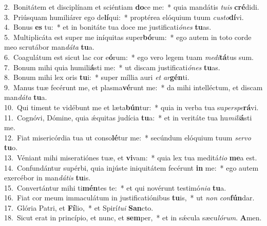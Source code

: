 {2.~}Bonitátem et disciplínam et sciéntiam \textbf{do}ce me:~* quia mandátis \textit{tu}\textit{is} \textbf{cré}didi.\\
{3.~}Priúsquam humiliárer ego de\textbf{lí}qui:~* proptérea elóquium tuum \textit{cu}\textit{sto}\textbf{dí}vi.\\
{4.~}Bonus \textbf{es} tu:~* et in bonitáte tua doce me justificati\textit{ó}\textit{nes} \textbf{tu}as.\\
{5.~}Multiplicáta est super me iníquitas super\textbf{bó}rum:~* ego autem in toto corde meo scrutábor man\textit{dá}\textit{ta} \textbf{tu}a.\\
{6.~}Coagulátum est sicut lac cor e\textbf{ó}rum:~* ego vero legem tuam \textit{me}\textit{di}\textbf{tá}tus sum.\\
{7.~}Bonum mihi quia humili\textbf{á}sti me:~* ut discam justificati\textit{ó}\textit{nes} \textbf{tu}as.\\
{8.~}Bonum mihi lex oris \textbf{tu}i:~* super míllia auri \textit{et} \textit{ar}\textbf{gén}ti.\\
{9.~}Manus tuæ fecérunt me, et plasma\textbf{vé}runt me:~* da mihi intelléctum, et discam man\textit{dá}\textit{ta} \textbf{tu}a.\\
{10.~}Qui timent te vidébunt me et læta\textbf{bún}tur:~* quia in verba tua su\textit{per}\textit{spe}\textbf{rá}vi.\\
{11.~}Cognóvi, Dómine, quia ǽquitas judícia \textbf{tu}a:~* et in veritáte tua hu\textit{mi}\textit{li}\textbf{á}sti me.\\
{12.~}Fiat misericórdia tua ut conso\textbf{lé}tur me:~* secúndum elóquium tuum \textit{ser}\textit{vo} \textbf{tu}o.\\
{13.~}Véniant mihi miseratiónes tuæ, et \textbf{vi}vam:~* quia lex tua meditá\textit{ti}\textit{o} \textbf{me}a est.\\
{14.~}Confundántur supérbi, quia injúste iniquitátem fecérunt \textbf{in} me:~* ego autem exercébor in man\textit{dá}\textit{tis} \textbf{tu}is.\\
{15.~}Convertántur mihi ti\textbf{mén}tes te:~* et qui novérunt testimó\textit{ni}\textit{a} \textbf{tu}a.\\
{16.~}Fiat cor meum immaculátum in justificatiónibus \textbf{tu}is,~* ut \textit{non} \textit{con}\textbf{fún}dar.\\
{17.~}Glória Patri, et \textbf{Fí}lio,~* et Spirí\textit{tu}\textit{i} \textbf{San}cto.\\
{18.~}Sicut erat in princípio, et nunc, et \textbf{sem}per,~* et in sǽcula sæcu\textit{ló}\textit{rum}. \textbf{A}men.\\
